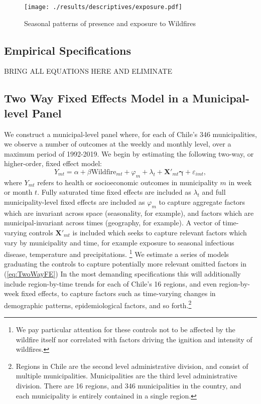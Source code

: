 \documentclass[11pt]{article}
\begin{document}
\begin{spacing}{1.3}
\begin{figure}
    \centering
    \texttt{[image: ./results/descriptives/exposure.pdf]}
    \caption{Seasonal patterns of presence and exposure to Wildfires}
    \label{fig:time}
\end{figure}    




\subsection{Empirical Specifications}
\label{sscn:empirics}
BRING ALL EQUATIONS HERE AND ELIMINATE 




\subsection{Two Way Fixed Effects Model in a Municipal-level Panel}
\label{sscn:comunatime}
We construct a municipal-level panel where, for each of Chile's 346 municipalities, we observe a number of outcomes at the weekly and monthly level, over a maximum period of 1992-2019.  We begin by estimating the following two-way, or higher-order, fixed effect model:
\begin{equation}
\label{eq:TwoWayFE}
Y_{mt}=\alpha + \beta\text{Wildfire}_{mt} + \varphi_m + \lambda_t + \bm{X}'_{mt}\bm{\gamma} + \varepsilon_{imt},
\end{equation}
where $Y_{mt}$ refers to health or socioeconomic outcomes in municipality $m$ in week or month $t$.  Fully saturated time fixed effects are included as $\lambda_t$ and full municipality-level fixed effects are included as $\varphi_m$ to capture aggregate factors which are invariant across space (seasonality, for example), and factors which are municipal-invariant across times (geography, for example).  A vector of time-varying controls $\bm{X}'_{mt}$ is included which seeks to capture relevant factors which vary by municipality and time, for example exposure to seasonal infectious disease, temperature and precipitations. \footnote{We pay particular attention for these controls not to be affected by the wildfire itself nor correlated with factors driving the ignition and intensity  of wildfires.}  We estimate a series of models graduating the controls to capture potentially more relevant omitted factors in (\ref{eq:TwoWayFE})  In the most demanding specifications this will additionally include region-by-time trends for each of Chile's 16 regions, and even region-by-week fixed effects, to capture factors such as time-varying changes in demographic patterns, epidemiological factors, and so forth.\footnote{Regions in Chile are the second level administrative division, and consist of multiple municipalities. Municipalities are the third level administrative division. There are 16 regions, and 346 municipalities in the country, and each municipality is entirely contained in a single region.} 


\end{spacing}
\end{document}
